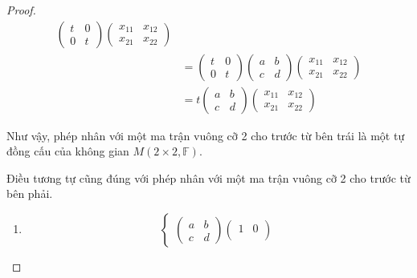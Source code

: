\documentclass[class=linearalgebra,crop=false]{standalone}
\begin{document}
\begin{proof}
\begin{align*}
\begin{pmatrix}
            t & 0 \\
            0 & t
        \end{pmatrix}
        \begin{pmatrix}
            x_{11} & x_{12} \\
            x_{21} & x_{22}
        \end{pmatrix}          \\
                             & =
        \begin{pmatrix}
            t & 0 \\
            0 & t
        \end{pmatrix}
        \begin{pmatrix}
            a & b \\
            c & d
        \end{pmatrix}
        \begin{pmatrix}
            x_{11} & x_{12} \\
            x_{21} & x_{22}
        \end{pmatrix}          \\
                             & =
        t
        \begin{pmatrix}
            a & b \\
            c & d
        \end{pmatrix}
        \begin{pmatrix}
            x_{11} & x_{12} \\
            x_{21} & x_{22}
        \end{pmatrix}
    \end{align*}
    \par Như vậy, phép nhân với một ma trận vuông cỡ 2 cho trước từ bên trái là một tự đồng cấu của không gian $M(2\times 2,\mathbb{F})$.
    \par Điều tương tự cũng đúng với phép nhân với một ma trận vuông cỡ 2 cho trước từ bên phải.
    \begin{enumerate}[label = (\alph*)]
        \item
              \[
                  \begin{cases}
                      \begin{pmatrix}
                          a & b \\
                          c & d
                      \end{pmatrix}
                      \begin{pmatrix}
                          1 & 0 \\

\end{pmatrix}
\end{cases}\]
\end{enumerate}
\end{proof}
\end{document}
